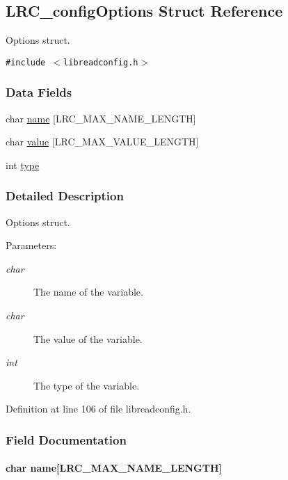 \hypertarget{struct_l_r_c__config_options}{
\subsection{LRC\_\-configOptions Struct Reference}
\label{struct_l_r_c__config_options}
}
Options struct.  


{\tt \#include $<$libreadconfig.h$>$}

\subsubsection*{Data Fields}
\begin{CompactItemize}
\item 
char \hyperlink{struct_l_r_c__config_options_3905a5526840a813b7d9f98268d66ec8}{name} \mbox{[}LRC\_\-MAX\_\-NAME\_\-LENGTH\mbox{]}
\item 
char \hyperlink{struct_l_r_c__config_options_643773f9f784c3c583c832c216ba32c9}{value} \mbox{[}LRC\_\-MAX\_\-VALUE\_\-LENGTH\mbox{]}
\item 
int \hyperlink{struct_l_r_c__config_options_c765329451135abec74c45e1897abf26}{type}
\end{CompactItemize}


\subsubsection{Detailed Description}
Options struct. 

\begin{Desc}
\item[Parameters:]
\begin{description}
\item[{\em char}]The name of the variable.\item[{\em char}]The value of the variable.\item[{\em int}]The type of the variable. \end{description}
\end{Desc}


Definition at line 106 of file libreadconfig.h.

\subsubsection{Field Documentation}
\hypertarget{struct_l_r_c__config_options_3905a5526840a813b7d9f98268d66ec8}{
\paragraph[{name}]{\setlength{\rightskip}{0pt plus 5cm}char {\bf name}\mbox{[}LRC\_\-MAX\_\-NAME\_\-LENGTH\mbox{]}}\hfill}
\label{struct_l_r_c__config_options_3905a5526840a813b7d9f98268d66ec8}




